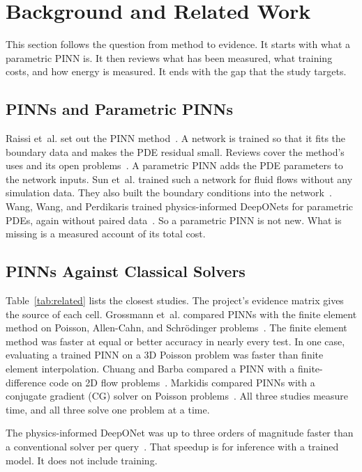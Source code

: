 \documentclass[journal]{IEEEtran}
\begin{document}
\section{Background and Related Work}\label{sec:related}

This section follows the question from method to evidence. It starts with what a parametric PINN is. It then reviews what has been measured, what training costs, and how energy is measured. It ends with the gap that the study targets.

\subsection{PINNs and Parametric PINNs}
Raissi et~al. set out the PINN method~\cite{raissi2019}. A network is trained so that it fits the boundary data and makes the PDE residual small. Reviews cover the method's uses and its open problems~\cite{karniadakis2021,cuomo2022,toscano2025}. A parametric PINN adds the PDE parameters to the network inputs. Sun et~al. trained such a network for fluid flows without any simulation data. They also built the boundary conditions into the network~\cite{sun2020}. Wang, Wang, and Perdikaris trained physics-informed DeepONets for parametric PDEs, again without paired data~\cite{wang2021deeponet}. So a parametric PINN is not new. What is missing is a measured account of its total cost.

\subsection{PINNs Against Classical Solvers}
Table~\ref{tab:related} lists the closest studies. The project's evidence matrix gives the source of each cell. Grossmann et~al. compared PINNs with the finite element method on Poisson, Allen-Cahn, and Schr\"odinger problems~\cite{grossmann2024}. The finite element method was faster at equal or better accuracy in nearly every test. In one case, evaluating a trained PINN on a 3D Poisson problem was faster than finite element interpolation. Chuang and Barba compared a PINN with a finite-difference code on 2D flow problems~\cite{chuang2022}. Markidis compared PINNs with a conjugate gradient (CG) solver on Poisson problems~\cite{markidis2021}. All three studies measure time, and all three solve one problem at a time.

The physics-informed DeepONet was up to three orders of magnitude faster than a conventional solver per query~\cite{wang2021deeponet}. That speedup is for inference with a trained model. It does not include training.
\end{document}
